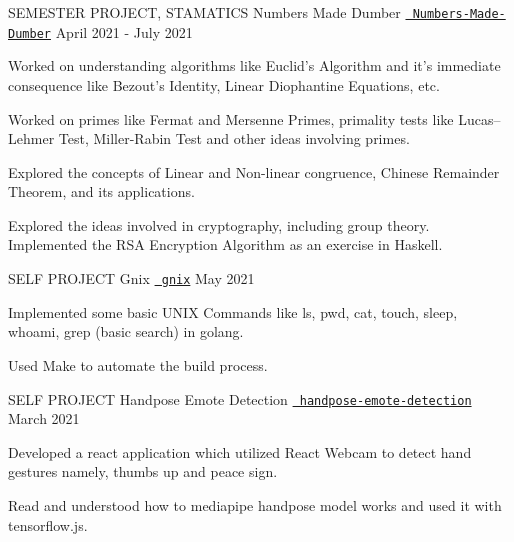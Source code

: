 \begin{cventries}
  {SEMESTER PROJECT, STAMATICS}
  {Numbers Made Dumber}
  {\texttt{\href{https://github.com/abhishekshree/Numbers-Made-Dumber}{\faGithub{} Numbers-Made-Dumber}}}
  {April 2021 - July 2021}
  {
    \begin{cvitems}
      \item Worked on understanding algorithms like Euclid's Algorithm and it's immediate consequence like Bezout's Identity, Linear Diophantine Equations, etc. 
      \item Worked on primes like Fermat and Mersenne Primes, primality tests like Lucas–Lehmer Test, Miller-Rabin Test and other ideas involving primes.
      \item Explored the concepts of Linear and Non-linear congruence, Chinese Remainder Theorem, and its applications.
      \item Explored the ideas involved in cryptography, including group theory. Implemented the RSA Encryption Algorithm as an exercise in Haskell.
    \end{cvitems}
  }
 \vspace{0.2cm}
   
  \cventry
  {SELF PROJECT}
  {Gnix}
  {\texttt{\href{https://github.com/abhishekshree/gnix}{\faGithub{} gnix}}}
  {May 2021}
  {
    \begin{cvitems}
      \item Implemented some basic UNIX Commands like ls, pwd, cat, touch, sleep, whoami, grep (basic search) in golang.
      \item Used Make to automate the build process.
    \end{cvitems}
  }
 \vspace{0.2cm}
  \cventry
  {SELF PROJECT}
  {Handpose Emote Detection}
  {\texttt{\href{https://github.com/abhishekshree/handpose-emote-detection}{\faGithub{} handpose-emote-detection}}}
  {March 2021}
  {
    \begin{cvitems}
      \item Developed a react application which utilized React Webcam to detect hand gestures namely, thumbs up and peace sign.
      \item Read and understood how to mediapipe handpose model works and used it with tensorflow.js.
    \end{cvitems}
  }
 \vspace{0.2cm}
  

\end{cventries}
